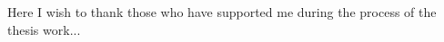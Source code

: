
\begin{acknowledgements}
Here I wish to thank those who have supported me during the process of the thesis work...



\end{acknowledgements}

